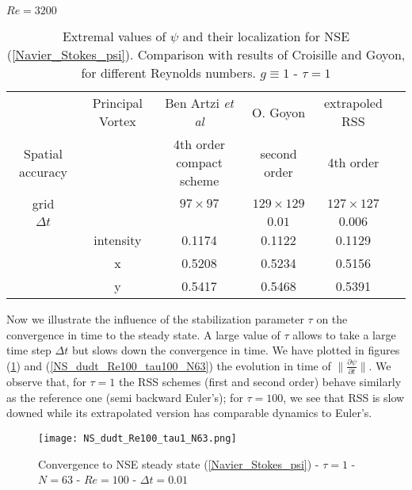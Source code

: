 {\begin{table}[!ht]
\begin{center}
\vspace{0.5cm}

$Re=3200$

\begin{tabular}{| c|c|c|c|c|c | }
\hline 
 & Principal Vortex  & Ben Artzi {\it et al} \cite{BenArtziCroisille} & O. Goyon \cite{Goyon} & extrapoled RSS \\ 
Spatial accuracy &                  & 4th order compact scheme                        & second order      &   4th order          \\
\hline 
grid &   & $97 \times 97$ & $ 129 \times 129$ & $127 \times 127$ \\ 
\hline
$\Delta t$ & & &$0.01$ & $0.006$\\ 
\hline
&intensity  & 0.1174 & 0.1122 & 0.1129 \\ 

  & x & 0.5208 & 0.5234 & 0.5156 \\ 

  & y & 0.5417 & 0.5468 & 0.5391 \\ 
\hline 
\end{tabular} 
\caption{Extremal values of  $\psi$ and their localization for NSE (\ref{Navier_Stokes_psi}). Comparison with results of Croisille and Goyon, for different Reynolds numbers. $g \equiv 1$ - $\tau = 1$}
\label{Vortex}
\end{center}
\end{table}


Now we illustrate the influence of the stabilization parameter $\tau$ on the convergence in time to the steady state.
A large value of $\tau$ allows to take a large time step $\Delta t$ but slows down the convergence in time.
We have plotted in figures  (\ref{NS_dudt_Re100_tau1_N63}) and (\ref{NS_dudt_Re100_tau100_N63})  the evolution in time of $\| \frac{\partial \psi}{\partial t} \|$. We observe that, for $\tau=1$ the RSS schemes (first and second order) behave similarly as the reference one (semi backward Euler's); for $\tau =100$, we see that RSS is slow downed while its extrapolated version has comparable dynamics to Euler's.

\begin{figure}[!ht]
\begin{center}
\texttt{[image: NS\_dudt\_Re100\_tau1\_N63.png]}
\caption{Convergence to NSE steady state (\ref{Navier_Stokes_psi}) - $\tau = 1$ -  $N=63$ - $Re = 100$ - $\Delta t = 0.01$}
\label{NS_dudt_Re100_tau1_N63}
\end{center}
\end{figure}

}
